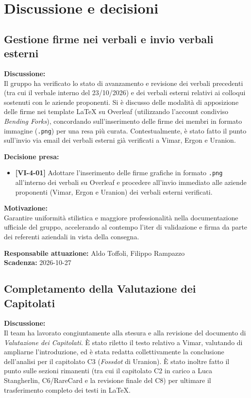 \documentclass[12pt,a4paper]{article}
\newcommand{\tightlist}{\setlength{\itemsep}{1pt}\setlength{\parskip}{0pt}}
\begin{document}
\hypertarget{discussione-e-decisioni}{%
\section{Discussione e decisioni}}

\hypertarget{argomento-1}{%
\subsection{Gestione firme nei verbali e invio verbali esterni}}

\textbf{Discussione:} \\
Il gruppo ha verificato lo stato di avanzamento e revisione dei verbali precedenti (tra cui il verbale interno del 23/10/2026) e dei verbali esterni relativi ai colloqui sostenuti con le aziende proponenti. Si è discusso delle modalità di apposizione delle firme nei template \LaTeX{} su Overleaf (utilizzando l'account condiviso \emph{Bending Forks}), concordando sull'inserimento delle firme dei membri in formato immagine (\texttt{.png}) per una resa più curata. Contestualmente, è stato fatto il punto sull'invio via email dei verbali esterni già verificati a Vimar, Ergon e Uranion.

\textbf{Decisione presa:}
\begin{itemize}
\tightlist
\item[$\checkmark$] \textbf{[VI-4-01]} Adottare l'inserimento delle firme grafiche in formato \texttt{.png} all'interno dei verbali su Overleaf e procedere all'invio immediato alle aziende proponenti (Vimar, Ergon e Uranion) dei verbali esterni verificati.
\end{itemize}

\textbf{Motivazione:} \\
Garantire uniformità stilistica e maggiore professionalità nella documentazione ufficiale del gruppo, accelerando al contempo l'iter di validazione e firma da parte dei referenti aziendali in vista della consegna.

\textbf{Responsabile attuazione:} Aldo Toffoli, Filippo Rampazzo \\
\textbf{Scadenza:} 2026-10-27

\hypertarget{argomento-2}{%
\subsection{Completamento della Valutazione dei Capitolati}}

\textbf{Discussione:} \\
Il team ha lavorato congiuntamente alla stesura e alla revisione del documento di \emph{Valutazione dei Capitolati}. È stato riletto il testo relativo a Vimar, valutando di ampliarne l'introduzione, ed è stata redatta collettivamente la conclusione dell'analisi per il capitolato C3 (\emph{Fossdot} di Uranion). È stato inoltre fatto il punto sulle sezioni rimanenti (tra cui il capitolato C2 in carico a Luca Stangherlin, C6/RareCard e la revisione finale del C8) per ultimare il trasferimento completo dei testi in \LaTeX{}.
\end{document}

